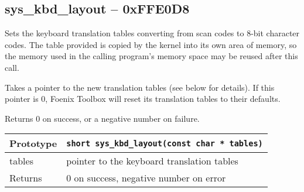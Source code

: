 \subsection*{sys\_kbd\_layout -- 0xFFE0D8}
Sets the keyboard translation tables converting from scan codes to 8-bit character codes.
The table provided is copied by the kernel into its own area of memory, so the memory used in the calling program's memory space may be reused after this call.

Takes a pointer to the new translation tables (see below for details). If this pointer is 0, Foenix Toolbox will reset its translation tables to their defaults.

Returns 0 on success, or a negative number on failure.

\bigskip

\begin{tabular}{|l||l|} \hline
Prototype & \lstinline!short sys_kbd_layout(const char * tables)! \\ \hline
tables & pointer to the keyboard translation tables \\ \hline
Returns & 0 on success, negative number on error \\ \hline
\end{tabular}
